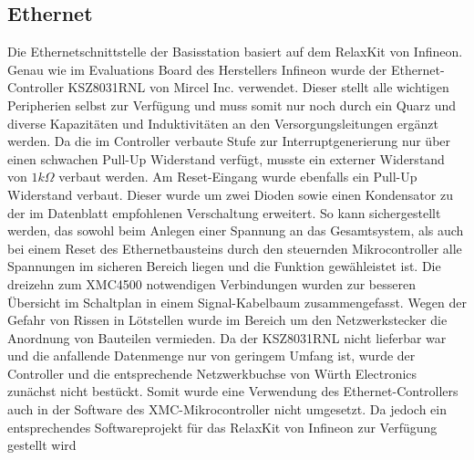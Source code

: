 \subsection{Ethernet}
Die Ethernetschnittstelle der Basisstation basiert auf dem RelaxKit von Infineon. Genau wie im Evaluations Board des Herstellers Infineon wurde der Ethernet-Controller KSZ8031RNL von Mircel Inc. verwendet. Dieser stellt alle wichtigen Peripherien selbst zur Verfügung und muss somit nur noch durch ein Quarz und diverse Kapazitäten und Induktivitäten an den Versorgungsleitungen ergänzt werden. Da die im Controller verbaute Stufe zur Interruptgenerierung nur über einen schwachen Pull-Up Widerstand verfügt, musste ein externer Widerstand von $1k\Omega$ verbaut werden. Am Reset-Eingang wurde ebenfalls ein Pull-Up Widerstand verbaut. Dieser wurde um zwei Dioden sowie einen Kondensator zu der im Datenblatt empfohlenen Verschaltung erweitert. So kann sichergestellt werden, das sowohl beim Anlegen einer Spannung an das Gesamtsystem, als auch bei einem Reset des Ethernetbausteins durch den steuernden Mikrocontroller alle Spannungen im sicheren Bereich liegen und die Funktion gewähleistet ist. Die dreizehn zum XMC4500 notwendigen Verbindungen wurden zur besseren Übersicht im Schaltplan in einem Signal-Kabelbaum zusammengefasst. Wegen der Gefahr von Rissen in Lötstellen wurde im Bereich um den Netzwerkstecker die Anordnung von Bauteilen vermieden. 
Da der KSZ8031RNL  nicht lieferbar war und die anfallende Datenmenge nur von geringem Umfang ist, wurde der Controller und die entsprechende Netzwerkbuchse von Würth Electronics zunächst nicht bestückt. Somit wurde eine Verwendung des Ethernet-Controllers auch in der Software des XMC-Mikrocontroller nicht umgesetzt. Da jedoch ein entsprechendes Softwareprojekt für das RelaxKit von Infineon zur Verfügung gestellt wird %









